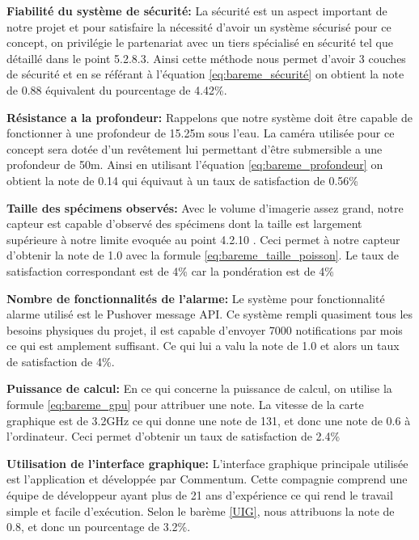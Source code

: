 \textbf{Fiabilité du système de sécurité:} La sécurité est un aspect important de notre projet et pour satisfaire la nécessité d’avoir un système sécurisé pour ce concept, on privilégie le partenariat avec un tiers spécialisé en sécurité tel que détaillé dans le point 5.2.8.3. Ainsi cette méthode nous permet d’avoir 3  couches de sécurité et en se référant à l’équation \ref{eq:bareme_sécurité} on obtient la note de 0.88 équivalent du pourcentage de 4.42\%.
\vspace{5mm}


\textbf{Résistance a la profondeur:} Rappelons que notre système doit être capable de fonctionner à une profondeur de 15.25m sous l’eau. La caméra utilisée pour ce concept sera dotée d’un revêtement lui permettant d’être submersible a une profondeur de 50m. Ainsi en utilisant l’équation \ref{eq:bareme_profondeur} on obtient la note de 0.14 qui équivaut à un taux de satisfaction de 0.56\%
\vspace{5mm}


\textbf{Taille des spécimens observés:} Avec le volume d’imagerie assez grand, notre capteur est capable d’observé des spécimens dont la taille est largement supérieure à notre limite evoquée au point 4.2.10 . Ceci permet à notre capteur d’obtenir la note de 1.0 avec la formule \ref{eq:bareme_taille_poisson}. Le taux de satisfaction correspondant est de 4\% car la pondération est de 4\%
\vspace{5mm}


\textbf{Nombre de fonctionnalités de l’alarme:} Le système pour fonctionnalité alarme utilisé est le Pushover message API. Ce système rempli quasiment tous les besoins physiques du projet, il est capable d’envoyer 7000 notifications par mois ce qui est amplement suffisant. Ce qui lui a valu la note de 1.0 et alors un taux de satisfaction de 4\%.
\vspace{5mm}


\textbf{Puissance de calcul:} En ce qui concerne la puissance de calcul, on utilise la formule \ref{eq:bareme_gpu} pour attribuer une note. La vitesse de la carte graphique est de 3.2GHz ce qui donne une note de 131, et donc une note de 0.6 à l’ordinateur. Ceci permet d’obtenir un taux de satisfaction de 2.4\%
\vspace{5mm}


\textbf{Utilisation de l’interface graphique:} L’interface graphique principale utilisée est l’application et développée par Commentum. Cette compagnie comprend une équipe de développeur ayant plus de 21 ans d’expérience ce qui rend le travail simple et facile d’exécution. Selon le barème \ref{UIG}, nous attribuons la note de 0.8, et donc un pourcentage de 3.2\%.
\vspace{5mm}


